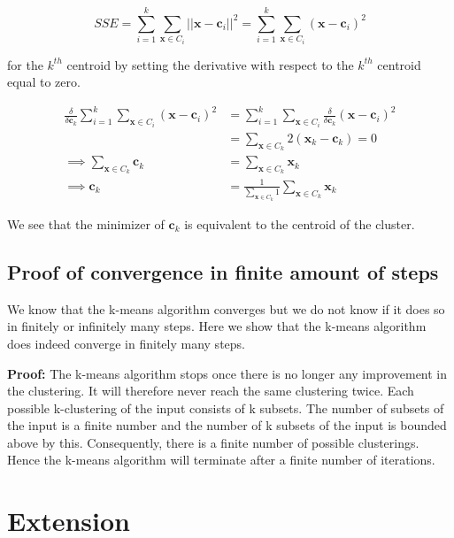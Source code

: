 \documentclass[11pt]{article}
\begin{document}
    \begin{equation}
        SSE = \sum_{i=1}^k \sum_{\mathbf{x} \in C_i} ||\mathbf{x} - \mathbf{c}_i||^2 
        = \sum_{i=1}^k \sum_{\mathbf{x} \in C_i} (\mathbf{x} - \mathbf{c}_i)^2
    \end{equation}
    
    for the $k^{th}$ centroid by setting the derivative with respect to the $k^{th}$ centroid equal to zero.
    
    \begin{equation}
    \begin{split}
        \frac{\delta}{\delta \mathbf{c}_k} \sum_{i=1}^k \sum_{\mathbf{x} \in C_i} (\mathbf{x} - \mathbf{c}_i)^2
        &= \sum_{i=1}^k \sum_{\mathbf{x} \in C_i}  \frac{\delta}{\delta \mathbf{c}_k} (\mathbf{x} - \mathbf{c}_i)^2\\
        &= \sum_{\mathbf{x} \in C_k} 2(\mathbf{x}_k - \mathbf{c}_k) = 0\\
        \implies \sum_{\mathbf{x} \in C_k} \mathbf{c}_k &= \sum_{\mathbf{x} \in C_k} \mathbf{x}_k\\
        \implies \mathbf{c}_k &= \frac{1}{\sum_{\mathbf{x} \in C_k} 1} \sum_{\mathbf{x} \in C_k} \mathbf{x}_k
    \end{split}
    \end{equation}
    
    We see that the minimizer of $\mathbf{c}_k$ is equivalent to the centroid of the cluster.
    
\subsection{Proof of convergence in finite amount of steps}
    We know that the k-means algorithm converges but we do not know if it does so in finitely or infinitely many steps. Here we show that the k-means algorithm does indeed converge in finitely many steps.
    \par \textbf{Proof:} The k-means algorithm stops once there is no longer any improvement in the clustering. It will therefore never reach the same clustering twice. Each possible k-clustering of the input consists of k subsets. The number of subsets of the input is a finite number and the number of k subsets of the input is bounded above by this. Consequently, there is a finite number of possible clusterings. Hence the k-means algorithm will terminate after a finite number of iterations.
\section{Extension}
\end{document}

